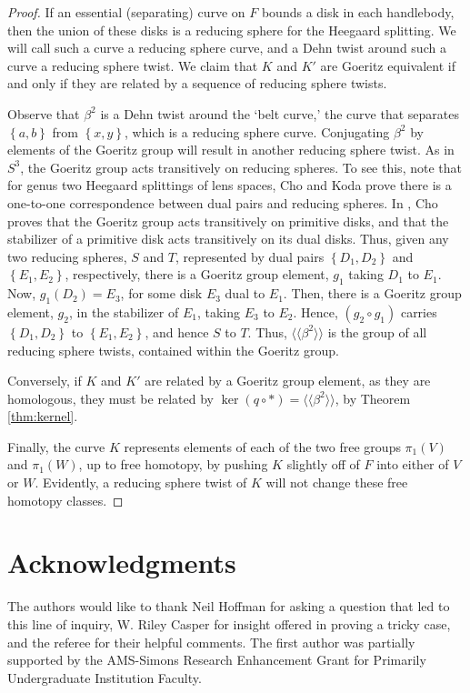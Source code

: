 \documentclass{amsart}     %
\newcommand{\set}[1]{ \left\{ #1 \right\} }
\theoremstyle{definition}
\begin{document}
\begin{proof}

If an essential (separating) curve on $F$ bounds a disk in each handlebody, then the union of these disks is a reducing sphere for the Heegaard splitting. We will call such a curve a reducing sphere curve, and a Dehn twist around such a curve a reducing sphere twist. We claim that $K$ and $K'$ are Goeritz equivalent if and only if they are related by a sequence of reducing sphere twists.  

Observe that $\beta^2$ is a Dehn twist around the `belt curve,' the curve that separates $\set{a, b}$ from $\set{x, y}$, which is a reducing sphere curve. Conjugating $\beta^2$ by elements of the Goeritz group will result in another reducing sphere twist. As in $S^3$, the Goeritz group acts transitively on reducing spheres. To see this, note that for genus two Heegaard splittings of lens spaces, Cho and Koda \cite{ChoKodHSG2HS} prove there is a one-to-one correspondence between dual pairs and reducing spheres. In \cite{ChoG2GGLS}, Cho proves that the Goeritz group acts transitively on primitive disks, and that the stabilizer of a primitive disk acts transitively on its dual disks. Thus, given any two reducing spheres, $S$ and $T$, represented by dual pairs $\set{D_1, D_2}$ and $\set{E_1, E_2}$, respectively, there is a Goeritz group element, $g_1$ taking $D_1$ to $E_1$. Now, $g_1(D_2) = E_3$, for some disk $E_3$ dual to $E_1$. Then, there is a Goeritz group element, $g_2$, in the stabilizer of $E_1$, taking $E_3$ to $E_2$. Hence, $(g_2 \circ g_1)$ carries $\set{D_1, D_2}$ to $\set{E_1, E_2}$, and hence $S$ to $T$. Thus, $\langle \langle \beta^2 \rangle \rangle$ is the group of all reducing sphere twists, contained within the Goeritz group.

Conversely, if $K$ and $K'$ are related by a Goeritz group element, as they are homologous, they must be related by $\ker(q \circ *) = \langle \langle \beta^2 \rangle \rangle$, by Theorem \ref{thm:kernel}.

Finally, the curve $K$ represents elements of each of the two free groups $\pi_1(V)$ and $\pi_1(W)$, up to free homotopy, by pushing $K$ slightly off of $F$ into either of $V$ or $W$. Evidently, a reducing sphere twist of $K$ will not change these free homotopy classes.
\end{proof}

\section{Acknowledgments}

The authors would like to thank Neil Hoffman for asking a question that led to this line of inquiry, W. Riley Casper for insight offered in proving a tricky case, and the referee for their helpful comments. The first author was partially supported by the AMS-Simons Research Enhancement Grant for Primarily Undergraduate Institution Faculty.




\end{document}
